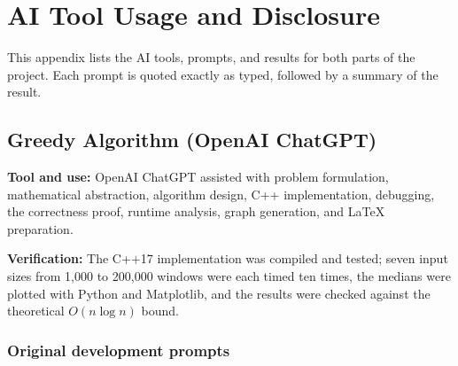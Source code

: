 \section{AI Tool Usage and Disclosure}

This appendix lists the AI tools, prompts, and results
for both parts of the project. Each prompt is quoted
exactly as typed, followed by a summary of the result.

\subsection{Greedy Algorithm (OpenAI ChatGPT)}

\noindent\textbf{Tool and use:} OpenAI ChatGPT assisted
with problem formulation, mathematical abstraction,
algorithm design, C++ implementation, debugging, the
correctness proof, runtime analysis, graph generation,
and LaTeX preparation.

\noindent\textbf{Verification:} The C++17 implementation
was compiled and tested; seven input sizes from 1,000
to 200,000 windows were each timed ten times, the
medians were plotted with Python and Matplotlib, and
the results were checked against the theoretical
$O(n\log n)$ bound.

\subsubsection{Original development prompts}

